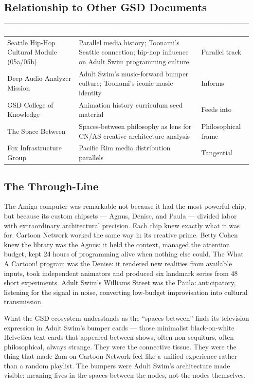 \documentclass[11pt,letterpaper]{article}
\newcommand{\tableheader}[1]{\textbf{\sffamily\textcolor{white}{#1}}}
\begin{document}
\subsection{Relationship to Other GSD Documents}

\begin{center}
\begin{tabularx}{\textwidth}{L{4cm}XL{3cm}}
\toprule
{}
\tableheader{Document} & \tableheader{Relationship} & \tableheader{Direction} \\
\midrule
Seattle Hip-Hop Cultural Module (05a/05b) & Parallel media history; Toonami's Seattle connection; hip-hop influence on Adult Swim programming culture & Parallel track \\
Deep Audio Analyzer Mission & Adult Swim's music-forward bumper culture; Toonami's iconic music identity & Informs \\
GSD College of Knowledge & Animation history curriculum seed material & Feeds into \\
The Space Between & Spaces-between philosophy as lens for CN/AS creative architecture analysis & Philosophical frame \\
Fox Infrastructure Group & Pacific Rim media distribution parallels & Tangential \\
\bottomrule
\end{tabularx}
\end{center}

\subsection{The Through-Line}

The Amiga computer was remarkable not because it had the most powerful chip, but because its custom chipsets --- Agnus, Denise, and Paula --- divided labor with extraordinary architectural precision. Each chip knew exactly what it was for. Cartoon Network worked the same way in its creative prime. Betty Cohen knew the library was the Agnus: it held the context, managed the attention budget, kept 24 hours of programming alive when nothing else could. The What A Cartoon! program was the Denise: it rendered new realities from available inputs, took independent animators and produced six landmark series from 48 short experiments. Adult Swim's Williams Street was the Paula: anticipatory, listening for the signal in noise, converting low-budget improvisation into cultural transmission.

What the GSD ecosystem understands as the ``spaces between'' finds its television expression in Adult Swim's bumper cards --- those minimalist black-on-white Helvetica text cards that appeared between shows, often non-sequiturs, often philosophical, always strange. They were the connective tissue. They were the thing that made 2am on Cartoon Network feel like a unified experience rather than a random playlist. The bumpers were Adult Swim's architecture made visible: meaning lives in the spaces between the nodes, not the nodes themselves.
\end{document}
